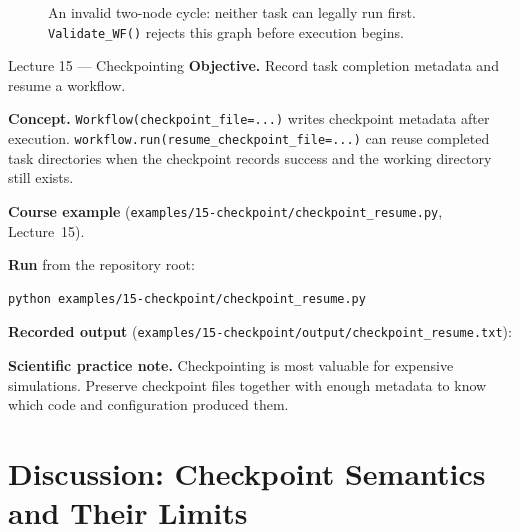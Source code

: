 \begin{figure}[h]
\centering
{}
\caption{An invalid two-node cycle: neither task can legally run first.
\texttt{Validate\_WF()} rejects this graph before execution begins.}
\label{fig:cycle}
\end{figure}

\begin{lessonbox}{Lecture 15 --- Checkpointing}
\textbf{Objective.} Record task completion metadata and resume a workflow.

\textbf{Concept.} \texttt{Workflow(checkpoint\_file=...)} writes checkpoint
metadata after execution. \texttt{workflow.run(resume\_checkpoint\_file=...)}
can reuse completed task directories when the checkpoint records success and
the working directory still exists.

\textbf{Course example} (\texttt{examples/15-checkpoint/checkpoint\_resume.py}, Lecture~15).


\textbf{Run} from the repository root:
\begin{lstlisting}[style=bash]
python examples/15-checkpoint/checkpoint_resume.py
\end{lstlisting}

\textbf{Recorded output} (\texttt{examples/15-checkpoint/output/checkpoint\_resume.txt}):


\textbf{Scientific practice note.} Checkpointing is most valuable for
expensive simulations. Preserve checkpoint files together with enough
metadata to know which code and configuration produced them.
\end{lessonbox}

\section{Discussion: Checkpoint Semantics and Their Limits}

